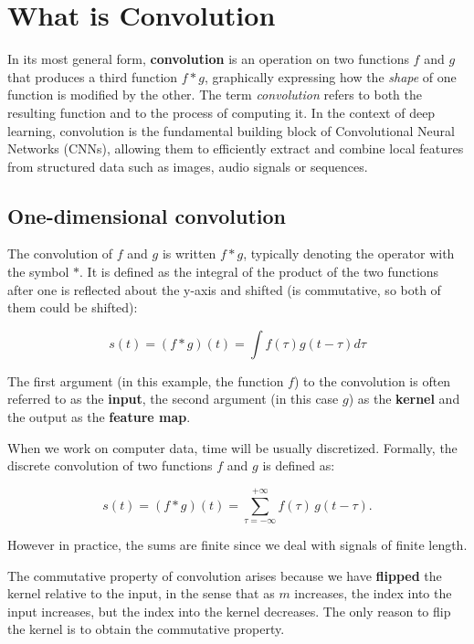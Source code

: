 \chapter{What is Convolution}
\label{ch:what-is-conv}%

In its most general form, \textbf{convolution} is an operation on two functions $f$ and $g$ that produces a third function $f*g$, graphically expressing how the \textit{shape} of one function is modified by the other. The term \textit{convolution} refers to both the resulting function and to the process of computing it. In the context of deep learning, convolution is the fundamental building block of Convolutional Neural Networks (CNNs), allowing them to efficiently extract and combine local features from structured data such as images, audio signals or sequences.

\clearpage

\section{One-dimensional convolution}

The convolution of $f$ and $g$ is written $f*g$, typically denoting the operator with the symbol $*$. It is defined as the integral of the product of the two functions after one is reflected about the y-axis and shifted (is commutative, so both of them could be shifted):

\begin{equation}
s(t)=(f * g)(t) = \int f(\tau)g(t-\tau)d\tau
\end{equation}

The first argument (in this example, the function $f$) to the convolution is often referred to as the \textbf{input}, the second argument (in this case $g$) as the \textbf{kernel} and the output as the \textbf{feature map}.

When we work on computer data, time will be usually discretized. Formally, the discrete convolution of two functions $f$ and $g$ is defined as:

\begin{equation}
s(t)=(f * g)(t) = \sum_{\tau=-\infty}^{+\infty} f(\tau) \, g(t - \tau).
\end{equation}

However in practice, the sums are finite since we deal with signals of finite length.  

The commutative property of convolution arises because we have \textbf{flipped} the kernel relative to the input, in the sense that as $m$ increases, the index into the input increases, but the index into the kernel decreases. The only reason to flip the kernel is to obtain the commutative property. 

